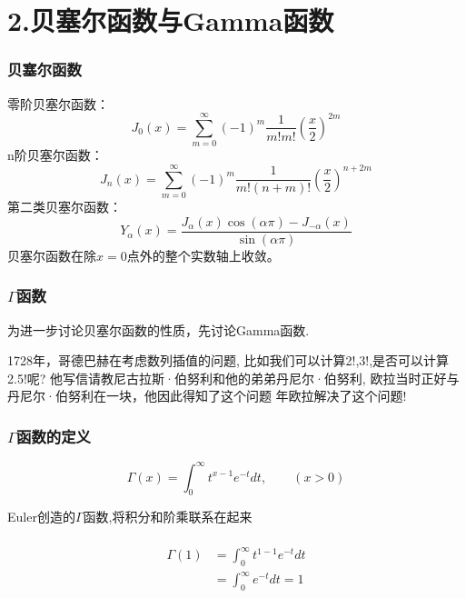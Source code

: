 \section{2.贝塞尔函数与Gamma函数}

\begin{frame}
	\frametitle{贝塞尔函数}
	零阶贝塞尔函数：
	\begin{equation*}
		J_0(x) = \sum\limits_{m=0}^{\infty} (-1)^m  \frac{1}{m! m! } (\frac{x}{2})^{2m} 
	\end{equation*}	
	n阶贝塞尔函数：
	\begin{equation*}
		J_n(x) = \sum\limits_{m=0}^{\infty} (-1)^m  \frac{1}{m! (n+m) ! } (\frac{x}{2})^{n+2m} 
	\end{equation*}	
	第二类贝塞尔函数：
	\begin{equation*}
		Y_{\alpha}(x)=\frac{J_{\alpha}(x) \cos (\alpha \pi)-J_{-\alpha}(x)}{\sin (\alpha \pi)}
	\end{equation*}	
	贝塞尔函数在除$x=0$点外的整个实数轴上收敛。
\end{frame}	

\begin{frame}
	\frametitle{$\Gamma$函数}
	为进一步讨论贝塞尔函数的性质，先讨论Gamma函数.\\  
	\begin{enumerate}
		\Item 1728年，哥德巴赫在考虑数列插值的问题, 比如我们可以计算2!,3!,是否可以计算2.5!呢? 
		\Item 他写信请教尼古拉斯·伯努利和他的弟弟丹尼尔·伯努利, 欧拉当时正好与丹尼尔·伯努利在一块，他因此得知了这个问题
		 年欧拉解决了这个问题! 
	\end{enumerate}
	\begin{figure}
		\centering
	\end{figure} 
	\setcounter{subfigure}{0}
\end{frame}	

\begin{frame}
	\frametitle{$\Gamma$函数的定义}	
	\begin{equation*}
		\Gamma(x)=\int_{0}^{\infty} t^{x-1} e^{-t} dt, \qquad (x>0)
	\end{equation*}	
	
	Euler创造的$\Gamma$函数,将积分和阶乘联系在起来\\ \vspace{0.6em}
	\例 [1.试证明]
	{ \[
		\Gamma(1)=1
	   \]}
	\证 ~	
\[ \begin{aligned}
	\Gamma(1)&=\int_{0}^{\infty} t^{1-1} e^{-t} dt \\	
			&=\int_{0}^{\infty}  e^{-t} dt =1	
\end{aligned}\]
\end{frame}	

